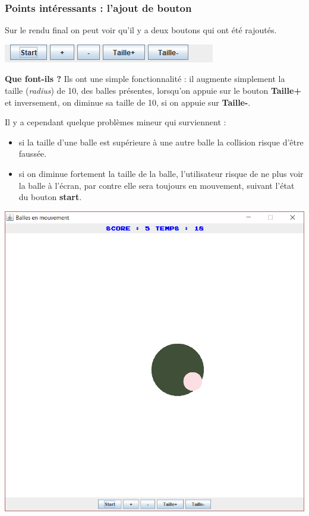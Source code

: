 \documentclass{article}
\begin{document}
\subsubsection{Points intéressants : l'ajout de bouton}
Sur le rendu final on peut voir qu'il y a deux boutons qui ont été rajoutés.

\begin{center}
	\includegraphics[scale=0.8]{Boutons.png}
\end{center}

\textbf{Que font-ils ?}
Ils ont une simple fonctionnalité : il augmente simplement la taille (\textit{radius}) de 10, des balles présentes, lorsqu'on appuie sur le bouton \textbf{Taille+} et inversement, on diminue sa taille de 10, si on appuie sur \textbf{Taille-}.
\newline

Il y a cependant quelque problèmes mineur qui surviennent : 
\begin{itemize}
	\item si la taille d'une balle est supérieure à une autre balle la collision risque d'être faussée.
	\item si on diminue fortement la taille de la balle, l'utilisateur risque de ne plus voir la balle à l'écran, par contre elle sera toujours en mouvement, suivant l'état du bouton \textbf{start}.
\end{itemize}


\begin{center}
	\includegraphics[scale=0.5 ]{ProblemeCollision.png}
\end{center}
\end{document}
